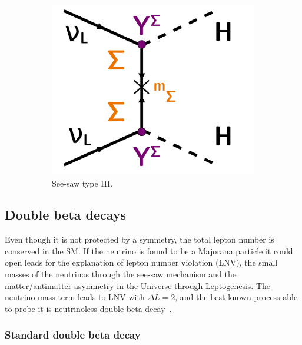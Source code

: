\begin{figure}[h]
\begin{subfigure}[t]{0.32\textwidth}
    \centering
    \includegraphics[height=0.7\textwidth]{neutrinophysics/fig_neutrinophysics/seesaw_III.pdf}
    \captionsetup{justification=justified}
    \caption{See-saw type III.
      \label{subfig:diagram_seesawIII}}
  \end{subfigure}
  \caption{
    \label{fig:diagram_seesaws}
  }
\end{figure}



\subsection{Double beta decays}
\label{subsec:double_beta_decays}


Even though it is not protected by a symmetry, the total lepton number is conserved in the SM.
If the neutrino is found to be a Majorana particle it could open leads for the explanation of lepton number violation (LNV), the small masses of the neutrinos through the see-saw mechanism and the matter/antimatter asymmetry in the Universe through Leptogenesis.
The neutrino mass term leads to LNV with $\Delta L = 2$, and the best known process able to probe it is neutrinoless double beta decay~\cite{art:Drewes_2013}.



\subsubsection*{Standard double beta decay}


